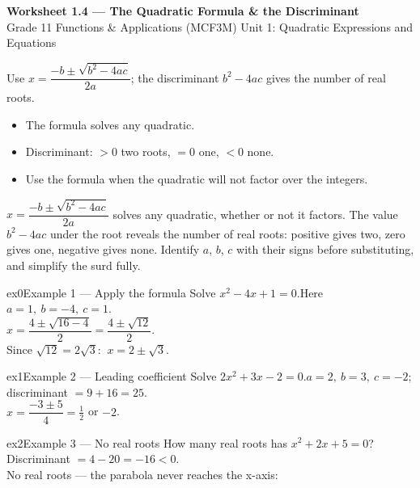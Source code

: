 \documentclass[11pt]{article}
\begin{document}
\begin{center}
{\LARGE\bfseries\color{titleblue}Worksheet 1.4 --- The Quadratic Formula \& the Discriminant}\\[2pt]
{\small Grade 11 Functions \& Applications (MCF3M) \textperiodcentered{} Unit 1: Quadratic Expressions and Equations}
\end{center}

\begin{ideabox}
Use $x=\dfrac{-b\pm\sqrt{b^2-4ac}}{2a}$; the discriminant $b^2-4ac$ gives the number of real roots.
\begin{itemize}[leftmargin=*,itemsep=2pt]
  \item The formula solves any quadratic.
  \item Discriminant: $>0$ two roots, $=0$ one, $<0$ none.
  \item Use the formula when the quadratic will not factor over the integers.
\end{itemize}
\end{ideabox}

\begin{learnbox}
$x=\dfrac{-b\pm\sqrt{b^2-4ac}}{2a}$ solves any quadratic, whether or not it factors.
The value $b^2-4ac$ under the root reveals the number of real roots: positive gives two, zero gives one, negative gives none.
Identify $a$, $b$, $c$ with their signs before substituting, and simplify the surd fully.
\end{learnbox}


\begin{example}{ex0}{Example 1 --- Apply the formula}
Solve $x^2-4x+1=0$.\soln Here $a=1,\ b=-4,\ c=1$. \\ $x=\dfrac{4\pm\sqrt{16-4}}{2}=\dfrac{4\pm\sqrt{12}}{2}$. \\ Since $\sqrt{12}=2\sqrt3$: $\ x=2\pm\sqrt3$.
\end{example}

\begin{example}{ex1}{Example 2 --- Leading coefficient}
Solve $2x^2+3x-2=0$.\soln $a=2,\ b=3,\ c=-2$; discriminant $=9+16=25$. \\ $x=\dfrac{-3\pm5}{4}=\tfrac12$ or $-2$.
\end{example}

\begin{example}{ex2}{Example 3 --- No real roots}
How many real roots has $x^2+2x+5=0$?\soln Discriminant $=4-20=-16<0$. \\ No real roots — the parabola never reaches the x-axis:
\end{example}
\end{document}
